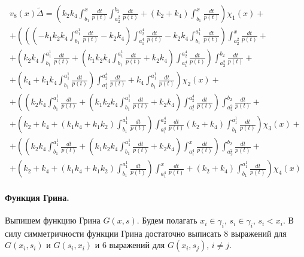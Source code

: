 \documentclass[a4paper,12pt]{article} %
\begin{document}
\begin{multline}
	{v_8(x)}{\tilde{\Delta}}=
	\left(
		k_2 k_4 \int_{b_1}^{x}\frac{dt}{p(t)} \int_{a_2^2}^{b_2}\frac{dt}{p(t)}+\left( k_2+k_4\right)  \int_{b_1}^{x}\frac{dt}{p(t)}
	\right)\chi_1(x)
	+\\+
	\left(
		\left( \left( -k_1 k_2 k_4 \int_{b_1}^{a_1^1}\frac{dt}{p(t)}-k_2 k_4\right)  \int_{a_1^4}^{a_2^4}\frac{dt}{p(t)}-k_2 k_4 \int_{b_1}^{a_1^1}\frac{dt}{p(t)}\right)  \int_{a_2^2}^{x}\frac{dt}{p(t)}
		\right. +\\+ \left.
		\left( k_2 k_4 \int_{b_1}^{a_1^1}\frac{dt}{p(t)}+\left( k_1 k_2 k_4 \int_{b_1}^{a_1^1}\frac{dt}{p(t)}+k_2 k_4\right)  \int_{a_1^4}^{a_2^4}\frac{dt}{p(t)}\right)  \int_{a_2^2}^{b_2}\frac{dt}{p(t)}
		\right. +\\+ \left.
		\left( k_4+k_1 k_4 \int_{b_1}^{a_1^1}\frac{dt}{p(t)}\right)  \int_{a_1^4}^{a_2^4}\frac{dt}{p(t)}+k_4 \int_{b_1}^{a_1^1}\frac{dt}{p(t)}
	\right)\chi_2(x)
	+\\+
	\left(
		\left( k_2 k_4 \int_{b_1}^{a_1^1}\frac{dt}{p(t)}+\left( k_1 k_2 k_4 \int_{b_1}^{a_1^1}\frac{dt}{p(t)}+k_2 k_4\right)  \int_{a_1^4}^{a_2^4}\frac{dt}{p(t)}\right)  \int_{a_2^2}^{b_2}\frac{dt}{p(t)}
		\right. +\\+ \left.
		\left( k_2+k_4+\left( k_1 k_4+k_1 k_2\right)  \int_{b_1}^{a_1^1}\frac{dt}{p(t)}\right)  \int_{a_1^4}^{a_2^4}\frac{dt}{p(t)}
		\left( k_2+k_4\right)  \int_{b_1}^{a_1^1}\frac{dt}{p(t)}
	\right)\chi_3(x)
	+\\+
	\left(
		\left( k_2 k_4 \int_{b_1}^{a_1^1}\frac{dt}{p(t)}+\left( k_1 k_2 k_4 \int_{b_1}^{a_1^1}\frac{dt}{p(t)}+k_2 k_4\right)  \int_{a_1^4}^{x}\frac{dt}{p(t)}\right)  \int_{a_2^2}^{b_2}\frac{dt}{p(t)}
		\right. +\\+ \left.
		\left( k_2+k_4+\left( k_1 k_4+k_1 k_2\right)  \int_{b_1}^{a_1^1}\frac{dt}{p(t)}\right)  \int_{a_1^4}^{x}\frac{dt}{p(t)}+\left( k_2+k_4\right)  \int_{b_1}^{a_1^1}\frac{dt}{p(t)}
	\right)\chi_4(x)
\end{multline}

\paragraph{Функция Грина.}
Выпишем функцию Грина $G(x,s)$.
Будем полагать $x_i\in\gamma_i$, $s_i\in\gamma_i$, $s_i < x_i$.
В силу симметричности функции Грина достаточно выписать 8 выражений для $G(x_i,s_i)$ и $G(s_i,x_i)$
и 6 выражений для $G(x_i,s_j)$, $i \neq j$.
\end{document}

